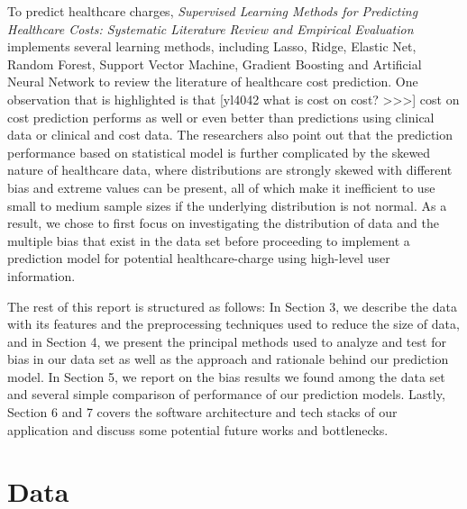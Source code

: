 \documentclass[10pt,twocolumn,letterpaper]{article}
\begin{document}
To predict healthcare charges, \textit{Supervised Learning Methods for Predicting Healthcare Costs: Systematic Literature Review and Empirical Evaluation} \cite{AMIA1} implements several learning methods, including Lasso, Ridge, Elastic Net, Random Forest, Support Vector Machine, Gradient Boosting and Artificial Neural Network to review the literature of healthcare cost prediction. One observation that is highlighted is that [yl4042 what is cost on cost? >>>] cost on cost prediction performs as well or even better than predictions using clinical data or clinical and cost data. The researchers also point out that the prediction performance based on statistical model is further complicated by the skewed nature of healthcare data, where distributions are strongly skewed with different bias and extreme values can be present, all of which make it inefficient to use small to medium sample sizes if the underlying distribution is not normal. As a result, we chose to first focus on investigating the distribution of data and the multiple bias that exist in the data set before proceeding to implement a prediction model for potential healthcare-charge using high-level user information.


The rest of this report is structured as follows: In Section 3, we describe the data with its features and the preprocessing techniques used to reduce the size of data, and in Section 4, we present the principal methods used to analyze and test for bias in our data set as well as the approach and rationale behind our prediction model. In Section 5, we report on the bias results we found among the data set and several simple comparison of performance of our prediction models. Lastly, Section 6 and 7 covers the software architecture and tech stacks of our application and discuss some potential future works and bottlenecks.

\section{Data}
\end{document}
